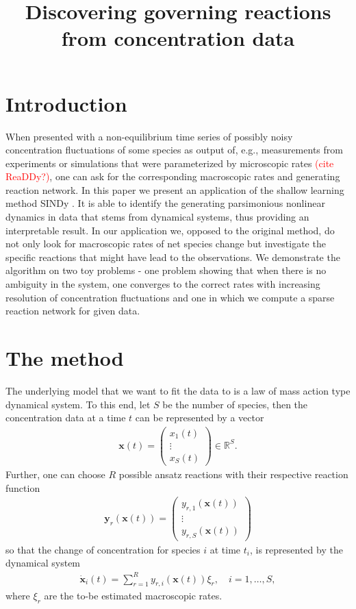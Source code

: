 \documentclass[oneside, abstracton, titlepage]{scrartcl}
\begin{document}
	\title{Discovering governing reactions from concentration data}
	\maketitle
	
	\section{Introduction}
	When presented with a non-equilibrium time series of possibly noisy concentration fluctuations of some species as output of, e.g., measurements from experiments or simulations that were parameterized by microscopic rates \textcolor{red}{(cite ReaDDy?)}, one can ask for the corresponding macroscopic rates and generating reaction network. 
	In this paper we present an application of the shallow learning method SINDy \cite{Brunton2015}. It is able to identify the generating parsimonious nonlinear dynamics in data that stems from dynamical systems, thus providing an interpretable result.
	In our application we, opposed to the original method, do not only look for macroscopic rates of net species change but investigate the specific reactions that might have lead to the observations.
	We demonstrate the algorithm on two toy problems - one problem showing that when there is no ambiguity in the system, one converges to the correct rates with increasing resolution of concentration fluctuations and one in which we compute a sparse reaction network for given data.
	
	\section{The method}
	The underlying model that we want to fit the data to is a law of mass action type dynamical system. To this end, let $S$ be the number of species, then the concentration data at a time $t$ can be represented by a vector
	\begin{align}
	\mathbf{x}(t)=\begin{pmatrix}
	x_1(t)\\ \vdots \\ x_S(t)
	\end{pmatrix}\in \mathbb{R}^S.
	\end{align}
	Further, one can choose $R$ possible ansatz reactions with their respective reaction function
	\begin{align}
	\textbf{y}_r(\textbf{x}(t))=\begin{pmatrix}
	y_{r,1}(\textbf{x}(t)) \\ \vdots \\ y_{r,S}(\textbf{x}(t))
	\end{pmatrix}
	\end{align}
	so that the change of concentration for species $i$ at time $t_i$, is represented by the dynamical system
	\begin{align}
	\dot{\textbf{x}}_i(t) = \sum_{r=1}^{R}y_{r,i}(\textbf{x}(t))\xi_r,\quad i=1,\ldots, S,
	\label{method:the-system}\end{align}
	where $\xi_r$ are the to-be estimated macroscopic rates.
	
\end{document}
